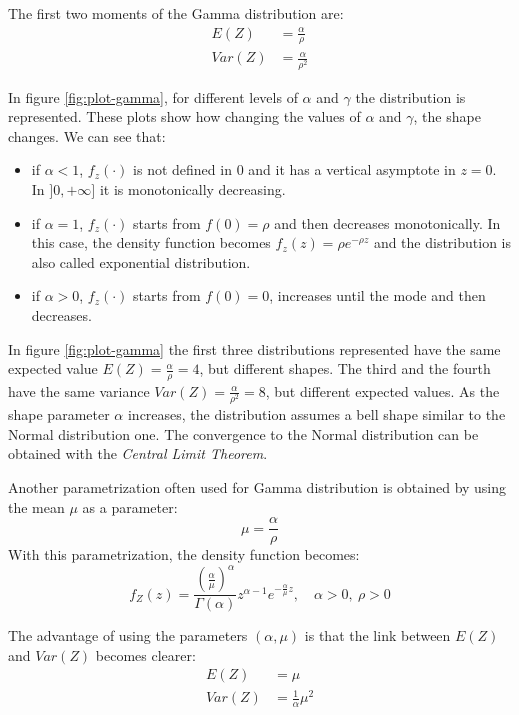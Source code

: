 \documentclass[a4paper, nobind]{templates/ociamthesis}
\providecommand{\tightlist}{%
  \setlength{\itemsep}{0pt}\setlength{\parskip}{0pt}}
\theoremstyle{definition}
\theoremstyle{definition}
\theoremstyle{definition}
\theoremstyle{remark}
\begin{document}
The first two moments of the Gamma distribution are:
\begin{align*}
E(Z)   & = \frac{\alpha}{\rho} \\
Var(Z) & = \frac{\alpha}{\rho^2}
\end{align*}

In figure \ref{fig:plot-gamma}, for different levels of \(\alpha\) and \(\gamma\) the distribution is represented. These plots show how changing the values of \(\alpha\) and \(\gamma\), the shape changes. We can see that:

\begin{itemize}
\tightlist
\item
  if \(\alpha < 1\), \(f_z(\cdot)\) is not defined in \(0\) and it has a vertical asymptote in \(z = 0\). In \(]0, +\infty]\) it is monotonically decreasing.
\item
  if \(\alpha = 1\), \(f_z(\cdot)\) starts from \(f(0) = \rho\) and then decreases monotonically. In this case, the density function becomes \(f_z(z) = \rho e^{-\rho z}\) and the distribution is also called exponential distribution.
\item
  if \(\alpha > 0\), \(f_z(\cdot)\) starts from \(f(0) = 0\), increases until the mode and then decreases.
\end{itemize}

In figure \ref{fig:plot-gamma} the first three distributions represented have the same expected value \(E(Z)=\frac{\alpha}{\rho} = 4\), but different shapes. The third and the fourth have the same variance \(Var(Z) = \frac{\alpha}{\rho^2} = 8\), but different expected values. As the shape parameter \(\alpha\) increases, the distribution assumes a bell shape similar to the Normal distribution one. The convergence to the Normal distribution can be obtained with the \emph{Central Limit Theorem}.

Another parametrization often used for Gamma distribution is obtained by using the mean \(\mu\) as a parameter:
\[
\mu = \frac{\alpha}{\rho}
\]
With this parametrization, the density function becomes:
\[
f_Z(z) = \frac{\left(\frac{\alpha}{\mu}\right)^\alpha}{\Gamma(\alpha)}z^{\alpha-1}e^{-\frac{\alpha}{\mu} z}, \quad \alpha > 0, \ \rho > 0
\]

The advantage of using the parameters \((\alpha, \mu)\) is that the link between \(E(Z)\) and \(Var(Z)\) becomes clearer:
\begin{align*}
E(Z)   & = \mu \\
Var(Z) & = \frac{1}{\alpha}\mu^2
\end{align*}
\end{document}
